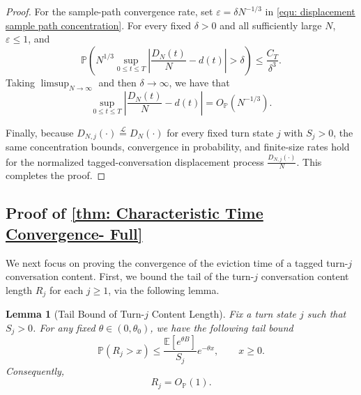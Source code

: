 \documentclass{article}
\newtheorem{lemma}[lemma]{Lemma}
\theoremstyle{definition}
\newcommand{\E}{\mathbb E}
\newcommand{\pro}{\mathbb P}
\begin{document}
\begin{proof}
    For the sample-path convergence rate, set $\varepsilon=\delta N^{-1/3}$ in \eqref{equ: displacement sample path concentration}. For every fixed $\delta>0$ and all sufficiently large $N$, $\varepsilon\leq 1$, and
    \begin{equation*}
        \pro\left(N^{1/3}\sup_{0\leq t\leq T}\left|\frac{D_N(t)}{N}-d(t)\right|>\delta\right)\leq\frac{C_T}{\delta^3}.
    \end{equation*}
    Taking $\limsup_{N\to\infty}$ and then $\delta\to\infty$, we have that
    \begin{equation*}
        \sup_{0\leq t\leq T}\left|\frac{D_N(t)}{N}-d(t)\right|=O_{\mathbb P}(N^{-1/3}).
    \end{equation*}

    Finally, because $D_{N,j}(\cdot)\stackrel{\mathcal L}{=}D_N(\cdot)$ for every fixed turn state $j$ with $S_j>0$, the same concentration bounds, convergence in probability, and finite-size rates hold for the normalized tagged-conversation displacement process $\frac{D_{N,j}(\cdot)}{N}$. This completes the proof.
\end{proof}

\subsection{Proof of \cref{thm: Characteristic Time Convergence- Full}}
\label{ssec: Proof of the Full Version of CT convergence}

We next focus on proving the convergence of the eviction time of a tagged turn-$j$ conversation content. First, we bound the tail of the turn-$j$ conversation content length $R_j$ for each $j\geq 1$, via the following lemma.


\begin{lemma}[Tail Bound of Turn-$j$ Content Length]
\label{lem: Tail Bound of Turn-j Content}
    Fix a turn state $j$ such that $S_j>0$. For any fixed $\theta\in(0,\theta_0)$, we have the following tail bound
    \begin{equation}
    \label{equ: Rj exponential tail}
        \pro(R_j>x)\leq \frac{\E[e^{\theta B}]}{S_j}e^{-\theta x}, \qquad x\geq0.
    \end{equation}
    Consequently,
    \begin{equation}
    \label{equ: Rj order}
        R_j=O_{\mathbb P}(1).
    \end{equation}
\end{lemma}
\end{document}
